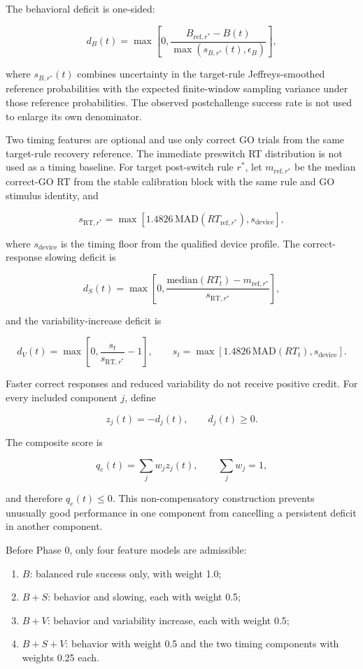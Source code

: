 The behavioral deficit is one-sided:

\[
d_B(t)
=
\max
\left[
0,
\frac{
B_{\mathrm{ref},r^\ast}-B(t)
}{
\max(s_{B,r^\ast}(t),\epsilon_B)
}
\right],
\]

where \(s_{B,r^\ast}(t)\) combines uncertainty in the target-rule Jeffreys-smoothed reference probabilities with the expected finite-window sampling variance under those reference probabilities. The observed postchallenge success rate is not used to enlarge its own denominator.

Two timing features are optional and use only correct GO trials from the same target-rule recovery reference. The immediate preswitch RT distribution is not used as a timing baseline. For target post-switch rule \(r^\ast\), let \(m_{\mathrm{ref},r^\ast}\) be the median correct-GO RT from the stable calibration block with the same rule and GO stimulus identity, and

\[
s_{\mathrm{RT},r^\ast}
=
\max
\left[
1.4826\,\mathrm{MAD}(RT_{\mathrm{ref},r^\ast}),
s_{\mathrm{device}}
\right],
\]

where \(s_{\mathrm{device}}\) is the timing floor from the qualified device profile. The correct-response slowing deficit is

\[
d_S(t)
=
\max
\left[
0,
\frac{
\mathrm{median}(RT_t)-m_{\mathrm{ref},r^\ast}
}{
s_{\mathrm{RT},r^\ast}
}
\right],
\]

and the variability-increase deficit is

\[
d_V(t)
=
\max
\left[
0,
\frac{s_t}{s_{\mathrm{RT},r^\ast}}-1
\right],
\qquad
s_t=
\max
\left[
1.4826\,\mathrm{MAD}(RT_t),
s_{\mathrm{device}}
\right].
\]

Faster correct responses and reduced variability do not receive positive credit. For every included component \(j\), define

\[
z_j(t)=-d_j(t),
\qquad
d_j(t)\ge 0.
\]

The composite score is

\[
q_e(t)
=
\sum_j w_j z_j(t),
\qquad
\sum_j w_j=1,
\]

and therefore \(q_e(t)\le 0\). This non-compensatory construction prevents unusually good performance in one component from cancelling a persistent deficit in another component.

Before Phase 0, only four feature models are admissible:

\begin{enumerate}
\item \(B\): balanced rule success only, with weight 1.0;
\item \(B+S\): behavior and slowing, each with weight 0.5;
\item \(B+V\): behavior and variability increase, each with weight 0.5;
\item \(B+S+V\): behavior with weight 0.5 and the two timing components with weights 0.25 each.
\end{enumerate}

